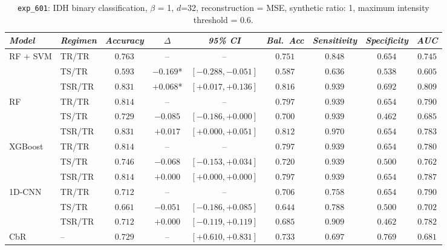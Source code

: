\begin{table}[H]
\centering
\scriptsize

\begin{tabular*}{\textwidth}{@{\extracolsep{\fill}}llccccccc}
\toprule
\emph{Model} & \emph{Regimen} & \emph{Accuracy} & \emph{$\Delta$} & \emph{95\% CI} & \emph{Bal.\ Acc} & \emph{Sensitivity} & \emph{Specificity} & \emph{AUC}\\
\midrule
\multirow{3}{*}{RF + SVM} & TR/TR & $0.763$ & -- & -- & $0.751$ & $0.848$ & $0.654$ & $0.745$\\
 & TS/TR & $0.593$ & $-0.169$* & $[-0.288, -0.051]$ & $0.587$ & $0.636$ & $0.538$ & $0.605$\\
 & TSR/TR & $0.831$ & $+0.068$* & $[+0.017, +0.136]$ & $0.816$ & $0.939$ & $0.692$ & $0.809$\\
\midrule
\multirow{3}{*}{RF} & TR/TR & $0.814$ & -- & -- & $0.797$ & $0.939$ & $0.654$ & $0.790$\\
 & TS/TR & $0.729$ & $-0.085$ & $[-0.186, +0.000]$ & $0.700$ & $0.939$ & $0.462$ & $0.685$\\
 & TSR/TR & $0.831$ & $+0.017$ & $[+0.000, +0.051]$ & $0.812$ & $0.970$ & $0.654$ & $0.783$\\
\midrule
\multirow{3}{*}{XGBoost} & TR/TR & $0.814$ & -- & -- & $0.797$ & $0.939$ & $0.654$ & $0.780$\\
 & TS/TR & $0.746$ & $-0.068$ & $[-0.153, +0.034]$ & $0.720$ & $0.939$ & $0.500$ & $0.762$\\
 & TSR/TR & $0.814$ & $+0.000$ & $[+0.000, +0.000]$ & $0.797$ & $0.939$ & $0.654$ & $0.787$\\
\midrule
\multirow{3}{*}{1D-CNN} & TR/TR & $0.712$ & -- & -- & $0.706$ & $0.758$ & $0.654$ & $0.790$\\
 & TS/TR & $0.661$ & $-0.051$ & $[-0.186, +0.085]$ & $0.644$ & $0.788$ & $0.500$ & $0.702$\\
 & TSR/TR & $0.712$ & $+0.000$ & $[-0.119, +0.119]$ & $0.685$ & $0.909$ & $0.462$ & $0.782$\\
\midrule
CbR & -- & $0.729$ & -- & $[+0.610, +0.831]$ & $0.733$ & $0.697$ & $0.769$ & $0.681$\\
\bottomrule
\end{tabular*}
\caption{\small \texttt{exp\_601}: IDH binary classification, $\beta$ = 1, $d$=32, reconstruction = MSE, synthetic ratio: 1, maximum intensity threshold = 0.6.}
\label{tab:ctrl_exp_601}
\end{table}

